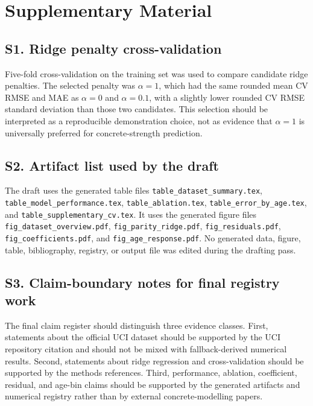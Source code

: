\section*{Supplementary Material}
\label{sec:supplementary}

\setcounter{figure}{0}
\renewcommand{\thefigure}{S\arabic{figure}}
\setcounter{table}{0}
\renewcommand{\thetable}{S\arabic{table}}
\renewcommand{\theHtable}{S\arabic{table}}

\subsection*{S1. Ridge penalty cross-validation}
\label{sec:sm_cv}

Five-fold cross-validation on the training set was used to compare candidate ridge penalties. The selected penalty was \(\alpha = 1\), which had the same rounded mean CV RMSE and MAE as \(\alpha = 0\) and \(\alpha = 0.1\), with a slightly lower rounded CV RMSE standard deviation than those two candidates. This selection should be interpreted as a reproducible demonstration choice, not as evidence that \(\alpha = 1\) is universally preferred for concrete-strength prediction.



\subsection*{S2. Artifact list used by the draft}
\label{sec:sm_artifacts}

The draft uses the generated table files \texttt{table\_dataset\_summary.tex}, \texttt{table\_model\_performance.tex}, \texttt{table\_ablation.tex}, \texttt{table\_error\_by\_age.tex}, and \texttt{table\_supplementary\_cv.tex}. It uses the generated figure files \texttt{fig\_dataset\_overview.pdf}, \texttt{fig\_parity\_ridge.pdf}, \texttt{fig\_residuals.pdf}, \texttt{fig\_coefficients.pdf}, and \texttt{fig\_age\_response.pdf}. No generated data, figure, table, bibliography, registry, or output file was edited during the drafting pass.

\subsection*{S3. Claim-boundary notes for final registry work}
\label{sec:sm_claim_boundaries}

The final claim register should distinguish three evidence classes. First, statements about the official UCI dataset should be supported by the UCI repository citation and should not be mixed with fallback-derived numerical results. Second, statements about ridge regression and cross-validation should be supported by the methods references. Third, performance, ablation, coefficient, residual, and age-bin claims should be supported by the generated artifacts and numerical registry rather than by external concrete-modelling papers.
